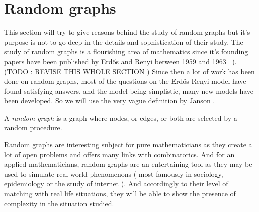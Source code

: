 \section{Random graphs}
This section will try to give reasons behind the study of random graphs but it's purpose is not to go deep in the details and sophistication of their study.
The study of random graphs is a flourishing area of mathematics since it's founding papers have been published by Erd\H{o}s and Renyi between 1959 and 1963 \cite{erdos59} \cite{erdos60} \cite{erdosconnect61} \cite{erdosevol61} \cite{erdos63}).
(TODO : REVISE THIS WHOLE SECTION )
Since then a lot of work has been done on random graphs, most of the questions on the Erd\H{o}s-Renyi model have found satisfying answers, and the model being simplistic, many new models have been developed.
So we will use the very vague definition by Janson \cite{Janson14}.
\begin{definition} A \emph{random graph} is a graph where nodes, or edges, or both are selected by a random procedure.
\end{definition}
Random graphs are interesting subject for pure mathematicians as they create a lot of open problems and offers many links with combinatorics. And for an applied mathematicians, random graphs are an entertaining tool as they may be used to simulate real world phenomenons ( most famously in sociology, epidemiology or the study of internet ). And accordingly to their level of matching with real life situations, they will be able to show the presence of complexity in the situation studied.
